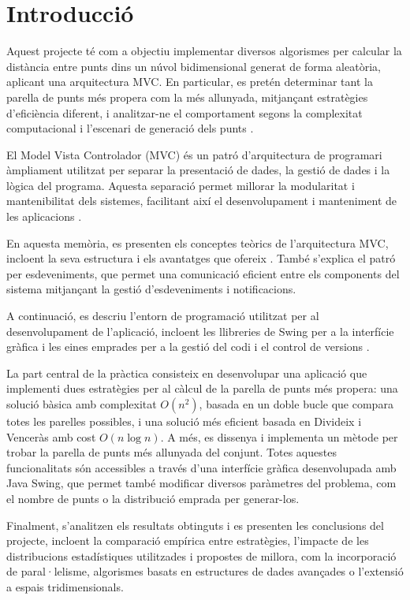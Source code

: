\documentclass{ieeetj}
\begin{document}
\section{Introducció} 
Aquest projecte té com a objectiu implementar diversos algorismes per calcular la distància entre punts dins un núvol bidimensional generat de forma aleatòria, aplicant una arquitectura MVC. En particular, es pretén determinar tant la parella de punts més propera com la més allunyada, mitjançant estratègies d’eficiència diferent, i analitzar-ne el comportament segons la complexitat computacional i l’escenari de generació dels punts \cite{closestPairTheory}.

El Model Vista Controlador (MVC) és un patró d'arquitectura de programari àmpliament utilitzat per separar la presentació de dades, la gestió de dades i la lògica del programa. Aquesta separació permet millorar la modularitat i mantenibilitat dels sistemes, facilitant així el desenvolupament i manteniment de les aplicacions \cite{MVC_Theory}.

En aquesta memòria, es presenten els conceptes teòrics de l'arquitectura MVC, incloent la seva estructura i els avantatges que ofereix \cite{mvcBenefits}. També s'explica el patró per esdeveniments, que permet una comunicació eficient entre els components del sistema mitjançant la gestió d'esdeveniments i notificacions.

A continuació, es descriu l'entorn de programació utilitzat per al desenvolupament de l'aplicació, incloent les llibreries de Swing per a la interfície gràfica i les eines emprades per a la gestió del codi i el control de versions \cite{SwingLibrary}.

La part central de la pràctica consisteix en desenvolupar una aplicació que implementi dues estratègies per al càlcul de la parella de punts més propera: una solució bàsica amb complexitat \( O(n^2) \), basada en un doble bucle que compara totes les parelles possibles, i una solució més eficient basada en Divideix i Venceràs amb cost \( O(n \log n) \). A més, es dissenya i implementa un mètode per trobar la parella de punts més allunyada del conjunt. Totes aquestes funcionalitats són accessibles a través d’una interfície gràfica desenvolupada amb Java Swing, que permet també modificar diversos paràmetres del problema, com el nombre de punts o la distribució emprada per generar-los.

Finalment, s'analitzen els resultats obtinguts i es presenten les conclusions del projecte, incloent la comparació empírica entre estratègies, l’impacte de les distribucions estadístiques utilitzades i propostes de millora, com la incorporació de paral·lelisme, algorismes basats en estructures de dades avançades o l’extensió a espais tridimensionals.
\end{document}
